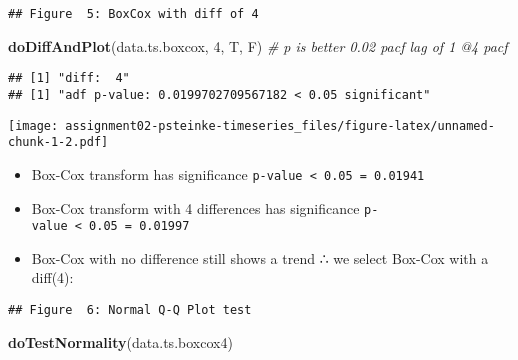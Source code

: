 \documentclass[]{article}
\newenvironment{Shaded}{\begin{snugshade}}{\end{snugshade}}
\newcommand{\CommentTok}[1]{\textcolor[rgb]{0.56,0.35,0.01}{\textit{#1}}}
\newcommand{\DataTypeTok}[1]{\textcolor[rgb]{0.13,0.29,0.53}{#1}}
\newcommand{\DecValTok}[1]{\textcolor[rgb]{0.00,0.00,0.81}{#1}}
\newcommand{\KeywordTok}[1]{\textcolor[rgb]{0.13,0.29,0.53}{\textbf{#1}}}
\newcommand{\NormalTok}[1]{#1}
\newcommand{\OperatorTok}[1]{\textcolor[rgb]{0.81,0.36,0.00}{\textbf{#1}}}
\newcommand{\StringTok}[1]{\textcolor[rgb]{0.31,0.60,0.02}{#1}}
\providecommand{\tightlist}{%
  \setlength{\itemsep}{0pt}\setlength{\parskip}{0pt}}
\begin{document}
\begin{verbatim}
## Figure  5: BoxCox with diff of 4
\end{verbatim}

\begin{Shaded}
\begin{Highlighting}[]
\KeywordTok{doDiffAndPlot}\NormalTok{(data.ts.boxcox, }\DecValTok{4}\NormalTok{, T, F) }\CommentTok{# p is better 0.02 pacf lag of 1 @4 pacf}
\end{Highlighting}
\end{Shaded}

\begin{verbatim}
## [1] "diff:  4"
## [1] "adf p-value: 0.0199702709567182 < 0.05 significant"
\end{verbatim}

\texttt{[image: assignment02-psteinke-timeseries\_files/figure-latex/unnamed-chunk-1-2.pdf]}

\begin{itemize}
\tightlist
\item
  Box-Cox transform has significance
  \texttt{p-value\ \textless{}\ 0.05\ =\ 0.01941}
\item
  Box-Cox transform with 4 differences has significance
  \texttt{p-value\ \textless{}\ 0.05\ =\ 0.01997}
\item
  Box-Cox with no difference still shows a trend ∴ we select Box-Cox
  with a diff(4):
\end{itemize}

\begin{Shaded}
\end{Shaded}

\begin{verbatim}
## Figure  6: Normal Q-Q Plot test
\end{verbatim}

\begin{Shaded}
\begin{Highlighting}[]
\KeywordTok{doTestNormality}\NormalTok{(data.ts.boxcox4)}
\end{Highlighting}
\end{Shaded}
\end{document}
